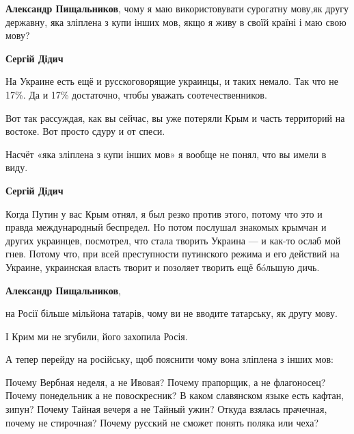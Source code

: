 \begin{itemize}
\begin{itemize}
\textbf{Александр Пищальников}, чому я маю використовувати сурогатну мову,як другу державну, яка зліплена з купи інших мов, якщо я живу в своїй країні і маю свою мову?

 
\textbf{Сергій Дідич} 

На Украине есть ещё и русскоговорящие украинцы, и таких немало. Так что не
17\%. Да и 17\% достаточно, чтобы уважать соотечественников.

Вот так рассуждая, как вы сейчас, вы уже потеряли Крым и часть территорий на
востоке. Вот просто сдуру и от спеси.

Насчёт «яка зліплена з купи інших мов» я вообще не понял, что вы имели в виду.

 
\textbf{Сергій Дідич} 

Когда Путин у вас Крым отнял, я был резко против этого, потому что это и правда
международный беспредел. Но потом послушал знакомых крымчан и других украинцев,
посмотрел, что стала творить Украина — и как-то ослаб мой гнев. Потому что, при
всей преступности путинского режима и его действий на Украине, украинская
власть творит и позоляет творить ещё бóльшую дичь.


 
\textbf{Александр Пищальников}, 

на Росії більше мільйона татарів, чому ви не вводите татарську, як другу мову.

І Крим ми не згубили, його захопила Росія.

А тепер перейду на російську, щоб пояснити чому вона зліплена з інших мов:

\obeycr
Почему Вербная неделя, а не Ивовая?
Почему прапорщик, а не флагоносец?
Почему понедельник а не повоскресник?
В каком славянском языке есть кафтан, зипун?
Почему Тайная вечеря а не Тайный ужин?
Откуда взялась прачечная, почему не стирочная?
Почему русский не сможет понять поляка или чеха?
\restorecr


\end{itemize}
\end{itemize}
